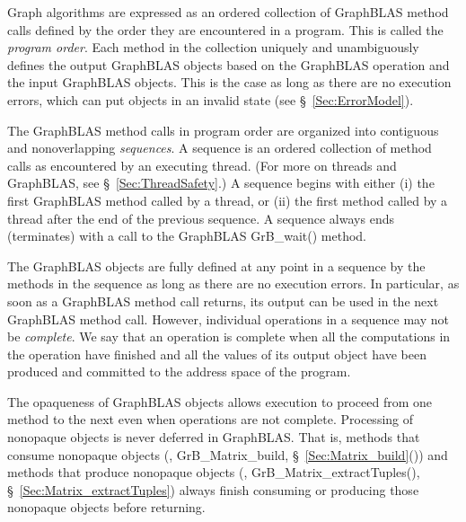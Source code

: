 Graph algorithms are expressed as an ordered collection of GraphBLAS
method calls defined by the order they are encountered in a program.
This is called the \emph{program order}.  Each method in the collection
uniquely and unambiguously defines the output GraphBLAS objects based
on the GraphBLAS operation and the input GraphBLAS objects. This is the case as long
as there are no execution errors, which can put objects in an
invalid state (see \S~\ref{Sec:ErrorModel}).

The GraphBLAS method calls in program order are organized into 
contiguous and nonoverlapping \emph{sequences}.  A sequence is an
ordered collection of method calls as encountered by an executing thread. (For more
on threads and GraphBLAS, see \S~\ref{Sec:ThreadSafety}.)  A sequence
begins with either (i) the first GraphBLAS method called by a thread, or
(ii) the first method called by a thread after the end of the previous
sequence. A sequence always ends (terminates) with a call to the GraphBLAS
{\sf GrB\_wait()} method.

The GraphBLAS objects are fully defined at any point in a sequence by the
methods in the sequence as long as there are no execution errors.
In particular, as soon as a GraphBLAS
method call returns, its output can be used in the next GraphBLAS
method call.  However, individual operations in a sequence may not
be \emph{complete}. We say that an operation is complete when all the
computations in the operation have finished and all the values of its
output object have been produced and committed to the address 
space of the program.

The opaqueness of GraphBLAS objects allows execution to proceed
from one method to the next even when operations are not complete.
Processing of nonopaque objects is never deferred in GraphBLAS. That is,
methods that consume nonopaque objects (\eg, {\sf GrB\_Matrix\_build},
\S~\ref{Sec:Matrix_build}()) and methods that produce nonopaque objects (\eg,
{\sf GrB\_Matrix\_extractTuples()}, \S~\ref{Sec:Matrix_extractTuples})
always finish consuming or producing those nonopaque objects before
returning.   

